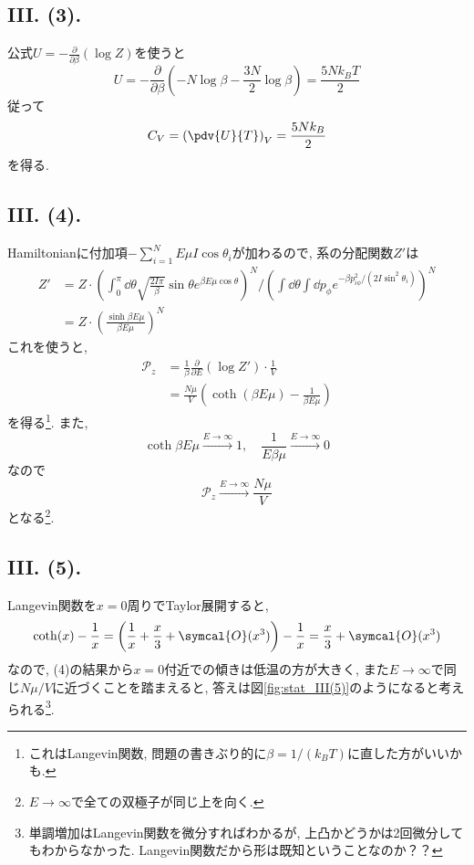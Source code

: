 \subsection*{III. (3). }

公式$U=-\frac{\partial}{\partial \beta}(\log{Z})$を使うと
\begin{equation}
  U=-\frac{\partial}{\partial\beta}(-N\log\beta-\frac{3N}{2}\log\beta)=\frac{5Nk_B T}{2}
\end{equation}
従って
\begin{equation}
  C_V=\left( \pdv{U}{T} \right)_V=\frac{5Nk_B}{2}
\end{equation}
を得る. 

\subsection*{III. (4). }
Hamiltonianに付加項$-\sum_{i=1}^N E\mu I\cos\theta_i$が加わるので, 系の分配関数$Z'$は
\begin{align*}
  Z'&=Z\cdot \left( \int_{0}^\pi \dd{\theta}\sqrt{\frac{2I\pi}{\beta}}\sin\theta e^{\beta E\mu\cos\theta} \right)^N/\left( \int\dd{\theta}\int\dd{p_{\phi}}e^{-\beta p_{i\phi}^2/(2I\sin^2\theta_i)} \right)^N\\
  &=Z\cdot \left( \frac{\sinh \beta E\mu}{\beta E\mu} \right)^N
\end{align*}
これを使うと, 
\begin{align*}
  \mathcal{P}_z&=\frac{1}{\beta}\frac{\partial}{\partial E}\left( \log{Z'} \right)\cdot\frac{1}{V}\\
  &=\frac{N\mu}{V}\left( \coth{(\beta E\mu)}-\frac{1}{\beta E\mu} \right)
\end{align*}
を得る\footnote{これはLangevin関数, 問題の書きぶり的に$\beta=1/(k_B T)$に直した方がいいかも. }. 
また, 
\begin{equation}
  \coth{\beta E\mu}\xrightarrow{E\to\infty}1, \quad \frac{1}{E\beta\mu}\xrightarrow{E\to\infty}0
\end{equation}
なので
\begin{equation}
  \mathcal{P}_z\xrightarrow{E\to\infty}\frac{N\mu}{V}
\end{equation}
となる\footnote{$E\to \infty$で全ての双極子が同じ上を向く. }. 

\subsection*{III. (5). }
Langevin関数を$x=0$周りでTaylor展開すると, 
\begin{equation}
  \coth(x)-\frac{1}{x}=\left( \frac{1}{x}+\frac{x}{3}+\symcal{O}(x^3) \right)-\frac{1}{x}=\frac{x}{3}+\symcal{O}(x^3)
\end{equation}
なので, (4)の結果から$x=0$付近での傾きは低温の方が大きく, また$E\to\infty$で同じ$N\mu/V$に近づくことを踏まえると, 答えは図\ref{fig:stat_III(5)}のようになると考えられる\footnote{単調増加はLangevin関数を微分すればわかるが, 上凸かどうかは2回微分してもわからなかった. Langevin関数だから形は既知ということなのか？？}. 

